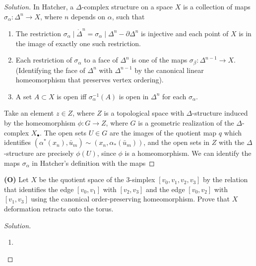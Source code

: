 \begin{proof}[Solution]
In Hatcher, a $\Delta$-complex structure on a space $X$ is a collection of maps $\sigma_\alpha: \Delta^n \to X$, where $n$ depends on $\alpha$, such that 
\begin{enumerate}
    \item The restriction $\sigma_\alpha \mid \mathring{\Delta}^n = \sigma_\alpha \mid \Delta^n - \partial \Delta^n$ is injective and each point of $X$ is in the image of exactly one such restriction.
    \item Each restriction of $\sigma_\alpha$ to a face of $\Delta^n$ is one of the maps $\sigma_\beta : \Delta^{n-1} \to X$. (Identifying the face of $\Delta ^n$ with $\Delta ^{n-1}$ by the canonical linear homeomorphism that preserves vertex ordering). 
    \item A set $A\subset X$ is open iff $\sigma_{\alpha}^{-1}(A)$ is open in $\Delta^{n}$ for each $\sigma_\alpha$. 
\end{enumerate}

Take an element $z \in Z$, where $Z$ is a topological space with $\Delta$-structure induced by the homeomorphism $\phi: G \to Z$, where $G$ is a geometric realization of the $\Delta$-complex $X_\bullet$. The open sets $U \in G$ are the images of the quotient map $q$ which identifies $(\alpha^*(x_n), \bar{u}_m) \sim  (x_n, \alpha_*(\bar{u}_m))$, and the open sets in $Z$ with the $\Delta$-structure are precisely $\phi(U)$, since $\phi$ is a homeomorphism. We can identify the maps $\sigma_\alpha$ in Hatcher's definition with the maps 
\end{proof}

\newpage



\begin{problem}
\textbf{(O)} Let $X$ be the quotient space of the 3-simplex $[v_0, v_1, v_2, v_3]$ by the relation that identifies the edge $[v_0, v_1]$ with $[v_2, v_3]$ and the edge $[v_0, v_2]$ with $[v_1, v_3]$  using the canonical order-preserving homeomorphism. Prove that $X$ deformation retracts onto the torus. 
\end{problem}

\begin{proof}[Solution]
\hfill
\begin{enumerate}[font=\normalfont,label=\textbf{(\alph*)}, wide]
\item
\end{enumerate}
\end{proof}

